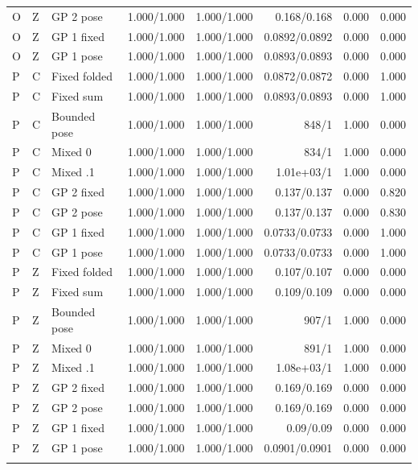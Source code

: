 \begin{table}[!t]
\begin{tabular}{lllrrrrr}
O & Z & GP 2 pose & 1.000/1.000 & 1.000/1.000 & 0.168/0.168 & 0.000 & 0.000 \\
O & Z & GP 1 fixed & 1.000/1.000 & 1.000/1.000 & 0.0892/0.0892 & 0.000 & 0.000 \\
O & Z & GP 1 pose & 1.000/1.000 & 1.000/1.000 & 0.0893/0.0893 & 0.000 & 0.000 \\
\addlinespace
P & C & Fixed folded & 1.000/1.000 & 1.000/1.000 & 0.0872/0.0872 & 0.000 & 1.000 \\
P & C & Fixed sum & 1.000/1.000 & 1.000/1.000 & 0.0893/0.0893 & 0.000 & 1.000 \\
P & C & Bounded pose & 1.000/1.000 & 1.000/1.000 & 848/1 & 1.000 & 0.000 \\
P & C & Mixed 0 & 1.000/1.000 & 1.000/1.000 & 834/1 & 1.000 & 0.000 \\
P & C & Mixed .1 & 1.000/1.000 & 1.000/1.000 & 1.01e+03/1 & 1.000 & 0.000 \\
P & C & GP 2 fixed & 1.000/1.000 & 1.000/1.000 & 0.137/0.137 & 0.000 & 0.820 \\
P & C & GP 2 pose & 1.000/1.000 & 1.000/1.000 & 0.137/0.137 & 0.000 & 0.830 \\
P & C & GP 1 fixed & 1.000/1.000 & 1.000/1.000 & 0.0733/0.0733 & 0.000 & 1.000 \\
P & C & GP 1 pose & 1.000/1.000 & 1.000/1.000 & 0.0733/0.0733 & 0.000 & 1.000 \\
\addlinespace
P & Z & Fixed folded & 1.000/1.000 & 1.000/1.000 & 0.107/0.107 & 0.000 & 0.000 \\
P & Z & Fixed sum & 1.000/1.000 & 1.000/1.000 & 0.109/0.109 & 0.000 & 0.000 \\
P & Z & Bounded pose & 1.000/1.000 & 1.000/1.000 & 907/1 & 1.000 & 0.000 \\
P & Z & Mixed 0 & 1.000/1.000 & 1.000/1.000 & 891/1 & 1.000 & 0.000 \\
P & Z & Mixed .1 & 1.000/1.000 & 1.000/1.000 & 1.08e+03/1 & 1.000 & 0.000 \\
P & Z & GP 2 fixed & 1.000/1.000 & 1.000/1.000 & 0.169/0.169 & 0.000 & 0.000 \\
P & Z & GP 2 pose & 1.000/1.000 & 1.000/1.000 & 0.169/0.169 & 0.000 & 0.000 \\
P & Z & GP 1 fixed & 1.000/1.000 & 1.000/1.000 & 0.09/0.09 & 0.000 & 0.000 \\
P & Z & GP 1 pose & 1.000/1.000 & 1.000/1.000 & 0.0901/0.0901 & 0.000 & 0.000 \\
\addlinespace
\bottomrule
\end{tabular}
\end{table}
